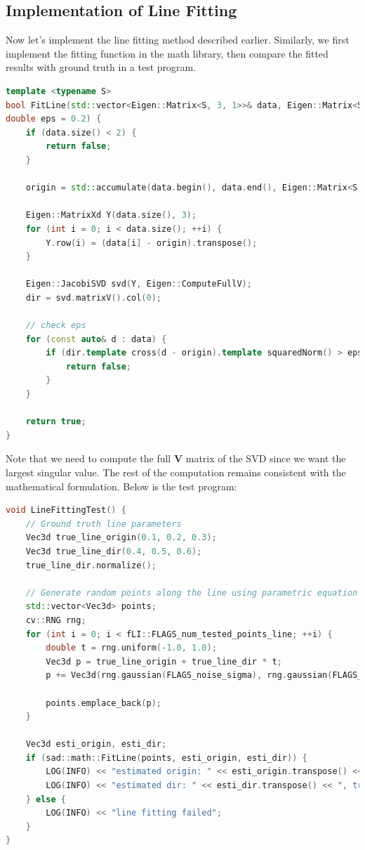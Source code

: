 \subsection{Implementation of Line Fitting}
Now let's implement the line fitting method described earlier. Similarly, we first implement the fitting function in the math library, then compare the fitted results with ground truth in a test program.

\begin{lstlisting}[language=c++,caption=src/common/math\_utils.h]
template <typename S>
bool FitLine(std::vector<Eigen::Matrix<S, 3, 1>>& data, Eigen::Matrix<S, 3, 1>& origin, Eigen::Matrix<S, 3, 1>& dir,
double eps = 0.2) {
	if (data.size() < 2) {
		return false;
	}
	
	origin = std::accumulate(data.begin(), data.end(), Eigen::Matrix<S, 3, 1>::Zero().eval()) / data.size();
	
	Eigen::MatrixXd Y(data.size(), 3);
	for (int i = 0; i < data.size(); ++i) {
		Y.row(i) = (data[i] - origin).transpose();
	}
	
	Eigen::JacobiSVD svd(Y, Eigen::ComputeFullV);
	dir = svd.matrixV().col(0);
	
	// check eps
	for (const auto& d : data) {
		if (dir.template cross(d - origin).template squaredNorm() > eps) {
			return false;
		}
	}
	
	return true;
}
\end{lstlisting}

Note that we need to compute the full $\bm{V}$ matrix of the SVD since we want the largest singular value. The rest of the computation remains consistent with the mathematical formulation. Below is the test program:

\begin{lstlisting}[language=c++,caption=src/ch5/linear\_fitting.cc]
void LineFittingTest() {
	// Ground truth line parameters
	Vec3d true_line_origin(0.1, 0.2, 0.3);
	Vec3d true_line_dir(0.4, 0.5, 0.6);
	true_line_dir.normalize();
	
	// Generate random points along the line using parametric equation
	std::vector<Vec3d> points;
	cv::RNG rng;
	for (int i = 0; i < fLI::FLAGS_num_tested_points_line; ++i) {
		double t = rng.uniform(-1.0, 1.0);
		Vec3d p = true_line_origin + true_line_dir * t;
		p += Vec3d(rng.gaussian(FLAGS_noise_sigma), rng.gaussian(FLAGS_noise_sigma), rng.gaussian(FLAGS_noise_sigma));
		
		points.emplace_back(p);
	}
	
	Vec3d esti_origin, esti_dir;
	if (sad::math::FitLine(points, esti_origin, esti_dir)) {
		LOG(INFO) << "estimated origin: " << esti_origin.transpose() << ", true: " << true_line_origin.transpose();
		LOG(INFO) << "estimated dir: " << esti_dir.transpose() << ", true: " << true_line_dir.transpose();
	} else {
		LOG(INFO) << "line fitting failed";
	}
}
\end{lstlisting}

